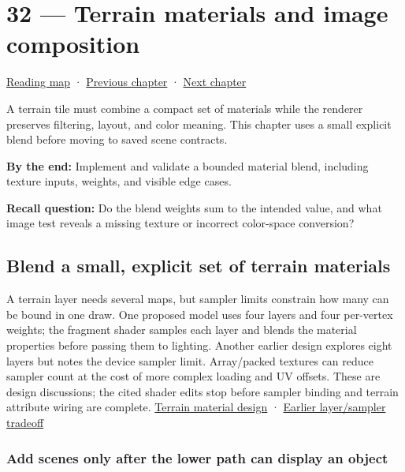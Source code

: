 \hypertarget{06-engine-ii-ch032}{}
\chapter{32 --- Terrain materials and image composition}\label{06-engine-ii-ch032-terrain-materials-and-image-composition}

\hyperref[volume-reading-map]{Reading map} · \hyperref[06-engine-ii-ch031]{Previous chapter} · \hyperref[06-engine-ii-ch033]{Next chapter}

A terrain tile must combine a compact set of materials while the renderer preserves filtering, layout, and color meaning. This chapter uses a small explicit blend before moving to saved scene contracts.

\textbf{By the end:} Implement and validate a bounded material blend, including texture inputs, weights, and visible edge cases.

\textbf{Recall question:} Do the blend weights sum to the intended value, and what image test reveals a missing texture or incorrect color-space conversion?

\section{Blend a small, explicit set of terrain materials}\label{06-engine-ii-ch032-blend-a-small-explicit-set-of-terrain-materials}

A terrain layer needs several maps, but sampler limits constrain how many can be bound in one draw. One proposed model uses four layers and four per-vertex weights; the fragment shader samples each layer and blends the material properties before passing them to lighting. Another earlier design explores eight layers but notes the device sampler limit. Array/packed textures can reduce sampler count at the cost of more complex loading and UV offsets. These are design discussions; the cited shader edits stop before sampler binding and terrain attribute wiring are complete. \href{https://www.youtube.com/watch?v=vLzvpFaX50A}{Terrain material design} · \href{https://www.youtube.com/watch?v=unypFSvg7gI}{Earlier layer/sampler tradeoff}

\subsection{Add scenes only after the lower path can display an object}\label{06-engine-ii-ch032-add-scenes-only-after-the-lower-path-can-display-an-object}


